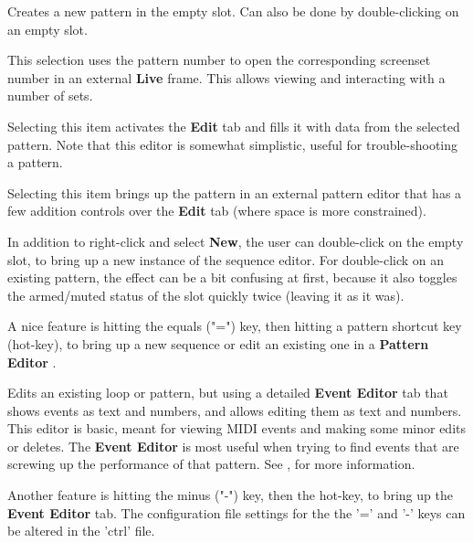    \setcounter{ItemCounter}{0}      %

   Creates a new pattern in the empty slot.
   Can also be done by double-clicking on an empty slot.

   This selection uses the pattern number to open the corresponding screenset
   number in an external \textbf{Live} frame.
   This allows viewing and interacting with a number of sets.

   Selecting this item activates the \textbf{Edit} tab and fills it with data
   from the selected pattern.
   Note that this editor is somewhat simplistic, useful for trouble-shooting a
   pattern.

   Selecting this item brings up the pattern in an external pattern editor that
   has a few addition controls over the \textbf{Edit} tab (where space is more
   constrained).

   In addition to right-click and select \textbf{New}, the user can
   double-click on the empty slot, to bring up a new instance of the sequence
   editor.  For double-click on an existing pattern,
   the effect can be a bit confusing at first,
   because it also toggles the armed/muted status of the slot
   quickly twice (leaving it as it was).


   A nice feature is hitting the equals ("=") key, then hitting
   a pattern shortcut key (hot-key), to bring up a new sequence or edit an
   existing one in a \textbf{Pattern Editor} .

   Edits an existing loop or pattern, but using a detailed \textbf{Event Editor}
   tab that shows events as text and numbers, and allows editing them as text
   and numbers.
   This editor is basic, meant for viewing
   MIDI events and making some minor edits or deletes.
   The \textbf{Event Editor} is most useful when trying to find events
   that are screwing up the performance of that pattern.
   See , for more information.

   Another feature is hitting the minus
   ("-") key, then the hot-key, to bring up the \textbf{Event Editor} tab.
   The configuration file settings for the the '=' and
   '-' keys can be altered in the 'ctrl' file.

